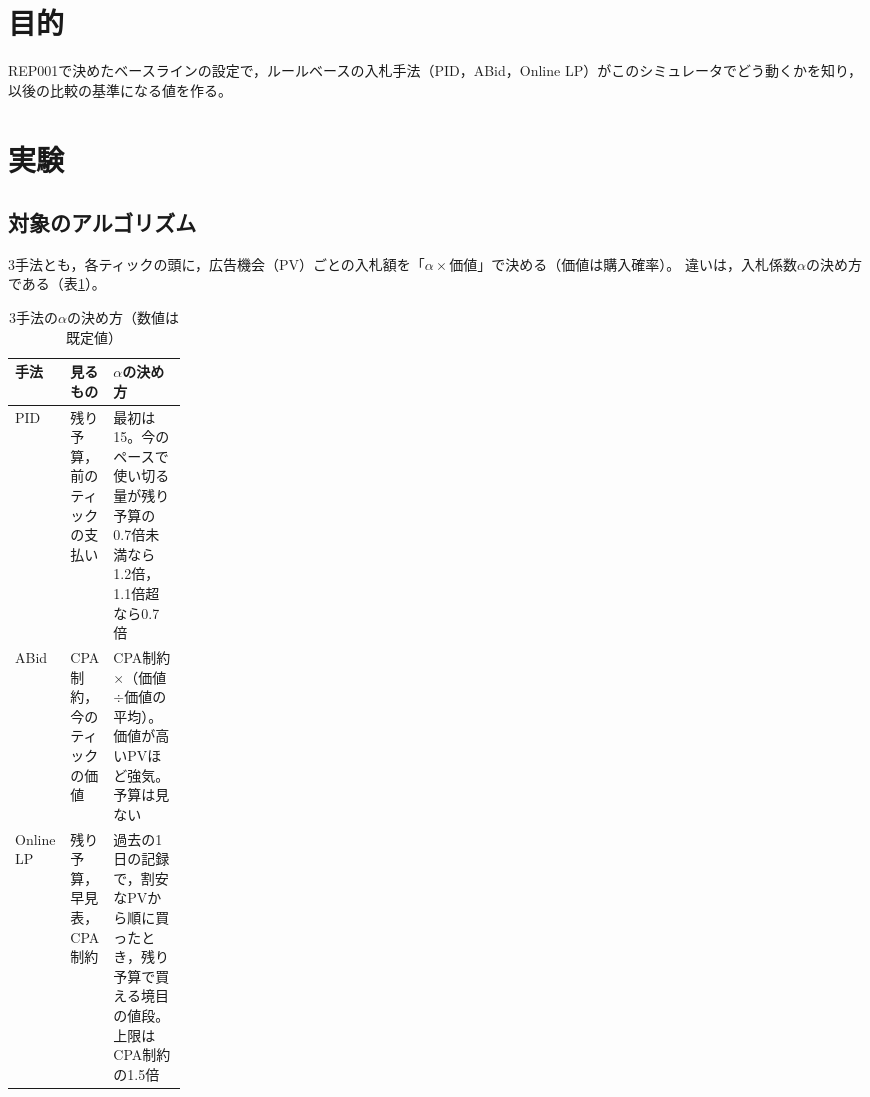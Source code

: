 \documentclass[twocolumn, 10pt]{ujarticle}
\begin{document}
\beginverification

\section{目的}\label{sec:e-purpose}

REP001で決めたベースラインの設定で，ルールベースの入札手法（PID，ABid，Online LP）がこのシミュレータでどう動くかを知り，以後の比較の基準になる値を作る。

\section{実験}\label{sec:e-exp}

\subsection{対象のアルゴリズム}\label{sec:e-algo}

3手法とも，各ティックの頭に，広告機会（PV）ごとの入札額を「$\alpha\times$価値」で決める（価値は購入確率）。
違いは，入札係数$\alpha$の決め方である（表\ref{tab:algo}）。

\begin{table}[H]
\centering
\caption{3手法の$\alpha$の決め方（数値は既定値）}
\label{tab:algo}
\footnotesize
\begin{tabularx}{\linewidth}{@{}l>{\raggedright\arraybackslash}p{0.2\linewidth}>{\raggedright\arraybackslash}X@{}}
\toprule
手法 & 見るもの & $\alpha$の決め方 \\
\midrule
PID & 残り予算，前のティックの支払い & 最初は15。今のペースで使い切る量が残り予算の0.7倍未満なら1.2倍，1.1倍超なら0.7倍 \\
\addlinespace
ABid & CPA制約，今のティックの価値 & CPA制約$\times$（価値$\div$価値の平均）。価値が高いPVほど強気。予算は見ない \\
\addlinespace
Online LP & 残り予算，早見表，CPA制約 & 過去の1日の記録で，割安なPVから順に買ったとき，残り予算で買える境目の値段。上限はCPA制約の1.5倍 \\
\bottomrule
\end{tabularx}
\end{table}
\end{document}
